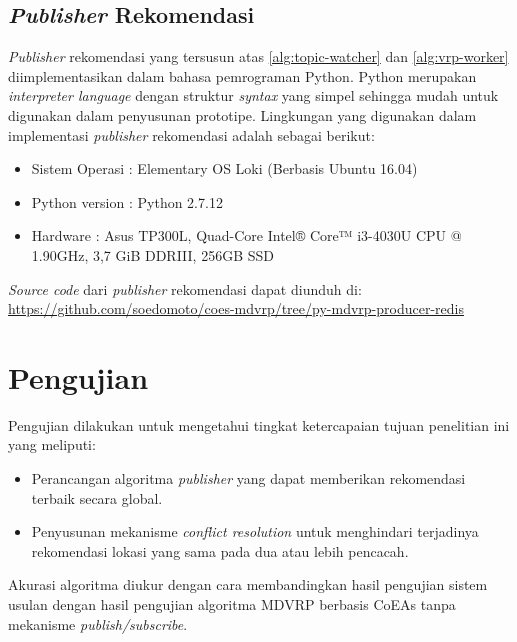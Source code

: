\subsection{\textit{Publisher} Rekomendasi}
\textit{Publisher} rekomendasi yang tersusun atas \autoref{alg:topic-watcher} dan \autoref{alg:vrp-worker} diimplementasikan dalam bahasa pemrograman Python. Python merupakan \textit{interpreter language} dengan struktur \textit{syntax} yang simpel sehingga mudah untuk digunakan dalam penyusunan prototipe. Lingkungan yang digunakan dalam implementasi \textit{publisher} rekomendasi adalah sebagai berikut:

\begin{itemize}
	\item Sistem Operasi		: Elementary OS Loki (Berbasis Ubuntu 16.04)
	\item Python version		: Python 2.7.12
	\item Hardware				: Asus TP300L, Quad-Core Intel® Core™ i3-4030U CPU @ 1.90GHz, 3,7 GiB DDRIII, 256GB SSD
\end{itemize}

\textit{Source code} dari \textit{publisher} rekomendasi dapat diunduh di: \url{https://github.com/soedomoto/coes-mdvrp/tree/py-mdvrp-producer-redis}

\section{Pengujian}
\label{sec:testing}
Pengujian dilakukan untuk mengetahui tingkat ketercapaian tujuan penelitian ini yang meliputi:
\begin{itemize}
	\item Perancangan algoritma \textit{publisher} yang dapat memberikan rekomendasi terbaik secara global.
	\item Penyusunan mekanisme \textit{conflict resolution} untuk menghindari terjadinya rekomendasi lokasi yang sama pada dua atau lebih pencacah.
\end{itemize}

Akurasi algoritma diukur dengan cara membandingkan hasil pengujian sistem usulan dengan hasil pengujian algoritma MDVRP berbasis CoEAs tanpa mekanisme \textit{publish/subscribe}.


